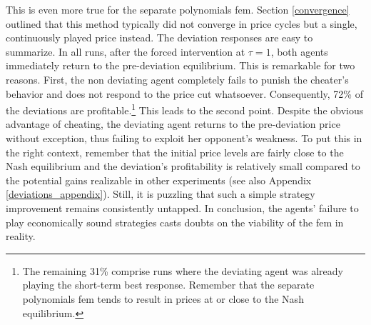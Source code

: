 This is even more true for the separate polynomials \gls{fem}. Section \ref{convergence} outlined that this method typically did not converge in price cycles but a single, continuously played price instead. The deviation responses are easy to summarize. In all runs, after the forced intervention at $\tau = 1$, both agents immediately return to the pre-deviation equilibrium. This is remarkable for two reasons. First, the non deviating agent completely fails to punish the cheater's behavior and does not respond to the price cut whatsoever. Consequently, 72\% of the deviations are profitable.\footnote{The remaining 31\% comprise runs where the deviating agent was already playing the short-term best response. Remember that the separate polynomials \gls{fem} tends to result in prices at or close to the Nash equilibrium.} This leads to the second point. Despite the obvious advantage of cheating, the deviating agent returns to the pre-deviation price without exception, thus failing to exploit her opponent's weakness. To put this in the right context, remember that the initial price levels are fairly close to the Nash equilibrium and the deviation's profitability is relatively small compared to the potential gains realizable in other experiments (see also Appendix \ref{deviations_appendix}). Still, it is puzzling that such a simple strategy improvement remains consistently untapped. In conclusion, the agents' failure to play economically sound strategies casts doubts on the viability of the \gls{fem} in reality.

